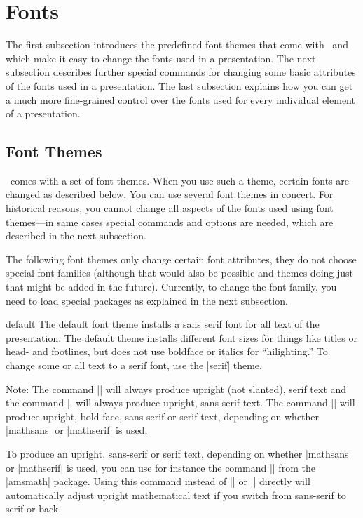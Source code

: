 
%


\section{Fonts}

\label{section-fonts}

The first subsection introduces the predefined font
themes that come with \beamer\ and which make it easy to change the
fonts used in a presentation. The next subsection describes further
special commands for changing some basic attributes of the fonts used in a 
presentation. The last subsection explains how you can get a much more
fine-grained control over the fonts used for every individual element
of a presentation. 





\subsection{Font Themes}

\beamer\ comes with a set of font themes. When you use such a theme,
certain fonts are changed as described below. You can use several font
themes in concert. For historical reasons, you cannot change all
aspects of the fonts used using font themes---in same cases special
commands and options are needed, which are described in the next
subsection.

The following font themes only change certain font attributes, they do
not choose special font families (although that would also be possible
and themes doing just that might be added in the future). Currently,
to change the font family, you need to load special packages as
explained in the next subsection.


\begin{fontthemeexample}{default}
  The default font theme installs a sans serif font for all text of
  the presentation. The default theme installs different font sizes
  for things like titles or head- and footlines, but does not use
  boldface or italics for ``hilighting.'' To change some or all text
  to a serif font, use the |serif| theme.

  Note: The command |\mathrm| will always produce upright (not
  slanted), serif text and the command |\mathsf| will always produce
  upright, sans-serif text. The command |\mathbf| will produce
  upright, bold-face, sans-serif or serif text, depending on whether
  |mathsans| or |mathserif| is used.

  To produce an upright, sans-serif or serif text, depending on
  whether |mathsans| or |mathserif| is used, you can use for instance
  the command |\operatorname| from the |amsmath| package. Using this
  command instead of |\mathrm| or |\mathsf| directly will
  automatically adjust  upright mathematical text if you switch from
  sans-serif to serif or back.
\end{fontthemeexample}

